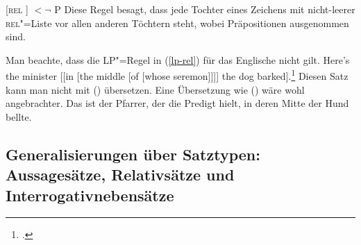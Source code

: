 \ea
\label{lp-rel}
{}[\textsc{rel} \sliste{ [] }] $< \neg$ P
\z
Diese Regel besagt, dass jede Tochter eines Zeichens mit nicht-leerer 
\textsc{rel}"=Liste vor allen anderen Töchtern steht, wobei Präpositionen ausgenommen sind. 

Man beachte, dass die LP"=Regel in (\ref{lp-rel}) für das
Englische nicht gilt.
\ea
Here's the minister [[in [the middle [of [whose seremon]]]] 
the dog barked].\footnote{ 
	.
}
\z
Diesen Satz kann man nicht mit () übersetzen.
\z
Eine Übersetzung wie () wäre wohl angebrachter.
\ea
Das ist der Pfarrer, der die Predigt hielt, in deren Mitte der Hund bellte.
\z
{}

\subsection{Generalisierungen über Satztypen: Aussagesätze, Relativsätze und Interrogativnebensätze}
\label{sec-Generalisierung-Satztypen}


